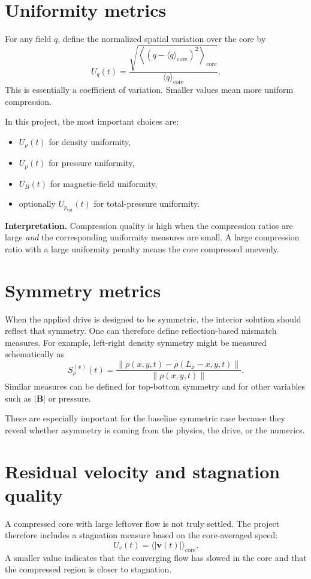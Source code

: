 \documentclass[11pt]{article}
\begin{document}
\section{Uniformity metrics}
For any field $q$, define the normalized spatial variation over the core by
\[
U_q(t) = \frac{\sqrt{\left\langle\left(q-\langle q\rangle_{\text{core}}\right)^2\right\rangle_{\text{core}}}}{\langle q\rangle_{\text{core}}}.
\]
This is essentially a coefficient of variation. Smaller values mean more uniform compression.

In this project, the most important choices are:
\begin{itemize}
    \item $U_{\rho}(t)$ for density uniformity,
    \item $U_{p}(t)$ for pressure uniformity,
    \item $U_{B}(t)$ for magnetic-field uniformity,
    \item optionally $U_{p_{\mathrm{tot}}}(t)$ for total-pressure uniformity.
\end{itemize}

\begin{physicsbox}
\textbf{Interpretation.} Compression quality is high when the compression ratios are large \emph{and} the corresponding uniformity measures are small. A large compression ratio with a large uniformity penalty means the core compressed unevenly.
\end{physicsbox}

\section{Symmetry metrics}
When the applied drive is designed to be symmetric, the interior solution should reflect that symmetry. One can therefore define reflection-based mismatch measures. For example, left-right density symmetry might be measured schematically as
\[
S_{\rho}^{(x)}(t) = \frac{\lVert\rho(x,y,t)-\rho(L_x-x,y,t)\rVert}{\lVert\rho(x,y,t)\rVert}.
\]
Similar measures can be defined for top-bottom symmetry and for other variables such as $|\mathbf{B}|$ or pressure.

These are especially important for the baseline symmetric case because they reveal whether asymmetry is coming from the physics, the drive, or the numerics.

\section{Residual velocity and stagnation quality}
A compressed core with large leftover flow is not truly settled. The project therefore includes a stagnation measure based on the core-averaged speed:
\[
U_v(t) = \langle |\mathbf{v}(t)|\rangle_{\text{core}}.
\]
A smaller value indicates that the converging flow has slowed in the core and that the compressed region is closer to stagnation.
\end{document}
